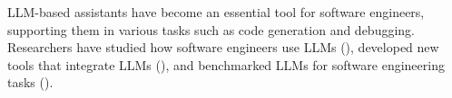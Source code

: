 LLM-based assistants have become an essential tool for software engineers, supporting them in various tasks such as code generation and debugging.
Researchers have studied how software engineers use LLMs (\llmusage), developed new tools that integrate LLMs (\newtools), and benchmarked LLMs for software engineering tasks (\benchmarkingtasks).
